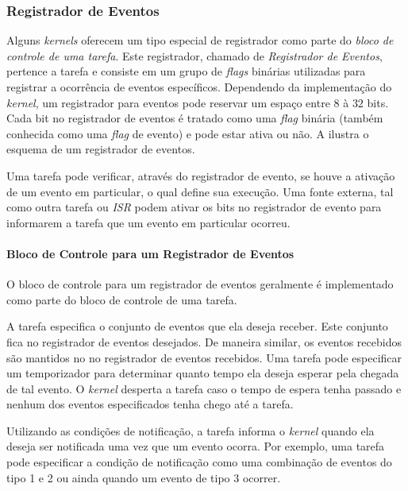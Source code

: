 
\subsubsection{Registrador de Eventos}

Alguns \emph{kernels} oferecem um tipo especial de registrador como parte do \emph{bloco de controle de uma tarefa}. Este registrador, chamado de \emph{Registrador de Eventos}, pertence a tarefa e consiste em um grupo de \emph{flags} binárias utilizadas para registrar a ocorrência de eventos específicos. Dependendo da implementação do \emph{kernel}, um registrador para eventos pode reservar um espaço entre $8$ à $32$ bits. Cada bit no registrador de eventos é tratado como uma \emph{flag} binária (também conhecida como uma \emph{flag} de evento) e pode estar ativa ou não. A  ilustra o esquema de um registrador de eventos.


Uma tarefa pode verificar, através do registrador de evento, se houve a ativação de um evento em particular, o qual define sua execução. Uma fonte externa, tal como outra tarefa ou \emph{ISR} podem ativar os bits no registrador de evento para informarem a tarefa que um evento em particular ocorreu.

\paragraph{Bloco de Controle para um Registrador de Eventos}

O bloco de controle para um registrador de eventos geralmente é implementado como parte do bloco de controle de uma tarefa.

A tarefa especifica o conjunto de eventos que ela deseja receber. Este conjunto fica no registrador de eventos desejados. De maneira similar, os eventos recebidos são mantidos no no registrador de eventos recebidos. Uma tarefa pode especificar um temporizador para determinar quanto tempo ela deseja esperar pela chegada de tal evento. O \emph{kernel} desperta a tarefa caso o tempo de espera tenha passado e nenhum dos eventos especificados tenha chego até a tarefa.

Utilizando as condições de notificação, a tarefa informa o \emph{kernel} quando ela deseja ser notificada uma vez que um evento ocorra. Por exemplo, uma tarefa pode especificar a condição de notificação como uma combinação de eventos do tipo 1 e 2 ou ainda quando um evento de tipo 3 ocorrer.

